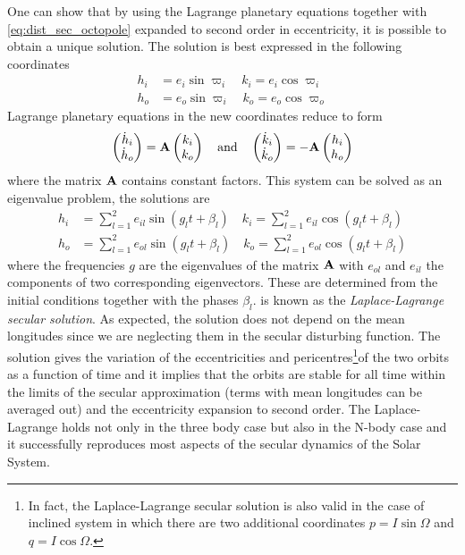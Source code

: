\documentclass[twoside,openright,titlepage,numbers=noenddot,headinclude,%
                footinclude=true,cleardoublepage=empty,abstractoff, 
                BCOR=5mm,paper=a4,fontsize=11pt,%
                american,%
                ]{scrreprt}%
\begin{document}
One can show \citep{murray} that by using the Lagrange planetary 
equations together with \cref{eq:dist_sec_octopole} expanded
to second order in eccentricity, it is possible to obtain
a unique solution. The solution is best expressed in the 
following coordinates
\begin{align}
    h_i&=e_i\sin\varpi_i\quad k_i=e_i\cos\varpi_i\\
    h_o&=e_o\sin\varpi_i\quad k_o=e_o\cos\varpi_o
\end{align}
Lagrange planetary equations in the new coordinates reduce to form
\begin{equation}
    \begin{pmatrix}
        \dot{h}_i\\
        \dot{h}_o
    \end{pmatrix}
    = \boldsymbol{\mathbf{A}}\begin{pmatrix}
        k_i\\
        k_o
    \end{pmatrix}
\quad    \text{and} \quad
\begin{pmatrix}
        \dot{k}_i\\
        \dot{k}_o
    \end{pmatrix}
    = -\boldsymbol{\mathbf{A}}\begin{pmatrix}
        h_i\\
        h_o
    \end{pmatrix}
\end{equation}
where the matrix $\boldsymbol{\mathbf{A}}$ contains constant factors. This
system can be solved as an eigenvalue problem, the solutions are
\begin{equation}
\begin{aligned}
    h_i&=\sum^2_{l=1}e_{il}\sin(g_lt+\beta_l)\quad
    k_i=\sum^2_{l=1}e_{il}\cos(g_lt+\beta_l)\\
    h_o&=\sum^2_{l=1}e_{ol}\sin(g_lt+\beta_l)\quad
    k_o=\sum^2_{l=1}e_{ol}\cos(g_lt+\beta_l)
\end{aligned}
    \label{eq:laplace_lagrange}
\end{equation}
where the frequencies $g$ are the eigenvalues of the matrix $\boldsymbol{\mathbf{A}}$
with $e_{ol}$ and $e_{il}$ the components of two corresponding 
eigenvectors. These are determined from the initial conditions together
with the phases $\beta_l$.  is known as
the \emph{Laplace-Lagrange secular solution}. As expected, the solution
does not depend on the mean longitudes since we are neglecting them
in the secular disturbing function. The solution gives the variation
of the eccentricities and pericentres\footnote{In fact, the 
Laplace-Lagrange secular solution is also valid in the case of inclined
system in which there are two additional coordinates $p=I\sin\Omega$
and $q=I\cos\Omega$.}of the two orbits as a function
of time and it implies that the orbits are stable for all time within
the limits of the secular approximation (terms with mean longitudes
can be averaged out) and the eccentricity expansion to second order.
The Laplace-Lagrange holds not only in the three body case but
also in the N-body case and it successfully reproduces most aspects
of the secular dynamics of the Solar System.
\end{document}
